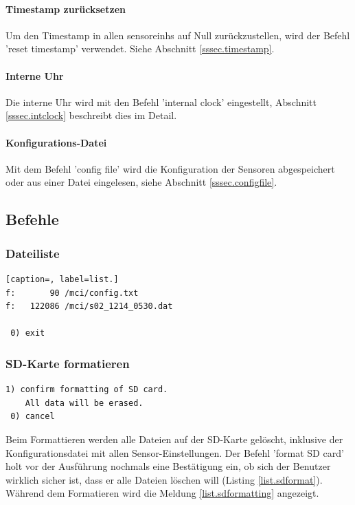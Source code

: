 \paragraph{Timestamp zurücksetzen} Um den Timestamp in allen \glspl{sensoreinh} auf Null zurückzustellen, wird der Befehl 'reset timestamp' verwendet. Siehe Abschnitt \ref{sssec.timestamp}.

\paragraph{Interne Uhr} Die interne Uhr wird mit den Befehl 'internal clock' eingestellt, Abschnitt \ref{sssec.intclock} beschreibt dies im Detail.

\paragraph{Konfigurations-Datei} Mit dem Befehl 'config file' wird die Konfiguration der Sensoren abgespeichert oder aus einer Datei eingelesen, siehe Abschnitt \ref{sssec.configfile}.

\subsection{Befehle}\label{ssec.befehle}

\subsubsection{Dateiliste}\label{sssec.listfiles}
\begin{lstlisting}[caption=, label=list.]
f:       90 /mci/config.txt
f:   122086 /mci/s02_1214_0530.dat

 0) exit
\end{lstlisting}


\subsubsection{SD-Karte formatieren}\label{sssec.sdformat}
\begin{lstlisting}[caption=Untermenü SD-Karte formatieren, label=list.sdformat]
 1) confirm formatting of SD card.
    All data will be erased.
 0) cancel
\end{lstlisting}

Beim Formattieren werden alle Dateien auf der SD-Karte gelöscht, inklusive der Konfigurationsdatei mit allen Sensor-Einstellungen. Der Befehl 'format SD card' holt vor der Ausführung nochmals eine Bestätigung ein, ob sich der Benutzer wirklich sicher ist, dass er alle Dateien löschen will (Listing \ref{list.sdformat}). Während dem Formatieren wird die Meldung \ref{list.sdformatting} angezeigt.

